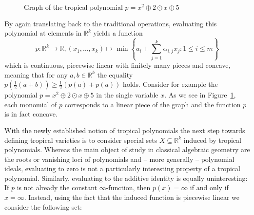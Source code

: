 \documentclass[
  paper=a4,
  titlepage,
  bibliography=totoc,
  pagesize=pdftex
]{scrartcl}
\numberwithin{figure}{section}
\numberwithin{equation}{section}
\numberwithin{table}{section}
\newcommand*\setR{\mathds{R}}
\theoremstyle{definition}
\numberwithin{definition}{section}
\begin{document}
\begin{figure}[tbh]
  \centering
  \caption{Graph of the tropical polynomial $p=x^2\oplus 2\odot x \oplus 5$}
  \label{fig:tropPolyPlot}
\end{figure}

By again translating back to the traditional operations, evaluating this polynomial at
elements in $\setR^k$ yields a function
\[
  p : \setR^k \to \setR, (x_1, \dots, x_k) \mapsto
  \min\left\{
    a_i + \sum_{j=1}^k \alpha_{i,j}x_j : 1 \leq i \leq m
  \right\}
\]
which is continuous, piecewise linear with finitely many pieces and concave, meaning that
for any $a,b \in \setR^k$ the equality $p(\frac12(a+b)) \geq \frac12(p(a)+p(a))$ holds.
Consider for example the polynomial $p = x^2 \oplus 2\odot x \oplus 5$ in the single
variable $x$. As we see in Figure~\ref{fig:tropPolyPlot}, each monomial of $p$ corresponds
to a linear piece of the graph and the function $p$ is in fact concave.

With the newly established notion of tropical polynomials the next step towards defining
tropical varieties is to consider special sets $X \subseteq \setR^k$ induced by tropical
polynomials. Whereas the main object of study in classical algebraic geometry are the
roots or vanishing loci of polynomials and -- more generally -- polynomial ideals,
evaluating to zero is not a particularly interesting property of a tropical polynomial.
Similarly, evaluating to the additive identity is equally uninteresting: If $p$ is not
already the constant $\infty$-function, then $p(x)=\infty$ if and only if $x=\infty$.
Instead, using the fact that the induced function is piecewise linear we consider the
following set:
\end{document}
